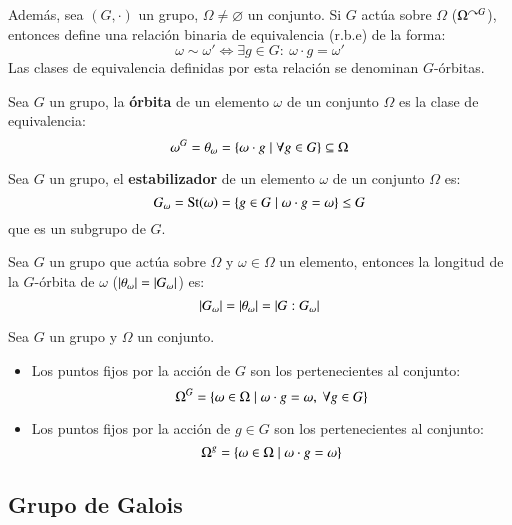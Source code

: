 Además, sea $(G, \cdot)$ un grupo, $\Omega \neq \varnothing$ un conjunto. Si $G$ actúa sobre $\Omega$ ($\Omega^{\curvearrowright G}$), entonces define una relación binaria de equivalencia (r.b.e) de la forma:
$$
    \omega \sim \omega' \iff \exists g \in G:\ \omega \cdot g = \omega'
$$
Las clases de equivalencia definidas por esta relación se denominan $G$-órbitas.

\begin{dfn}
    Sea $G$ un grupo, la \textbf{órbita} de un elemento $\omega$ de un conjunto $\Omega$ es la clase de equivalencia:
    $$
        \omega^G = \theta_\omega = \left\{\omega \cdot g \mid \forall g \in G\right\} \subseteq \Omega
    $$
\end{dfn}

\begin{dfn}
    Sea $G$ un grupo, el \textbf{estabilizador} de un elemento $\omega$ de un conjunto $\Omega$ es:
    $$
        G_\omega = \mathrm{St}(\omega) = \left\{g \in G \mid \omega \cdot g = \omega\right\} \leq G
    $$
    que es un subgrupo de $G$.
\end{dfn}

\begin{thm}\label{thm:orbita}
    Sea $G$ un grupo que actúa sobre $\Omega$ y $\omega \in \Omega$ un elemento, entonces la longitud de la $G$-órbita de $\omega$ ($\left|\theta_\omega\right| = \left|G_\omega\right|$) es:
    $$
        \left|G_\omega\right| = \left|\theta_\omega\right| = \left|G:G_\omega\right|
    $$
\end{thm}

\begin{dfn}
    Sea $G$ un grupo y $\Omega$ un conjunto.
    \begin{itemize}
        \item Los puntos fijos por la acción de $G$ son los pertenecientes al conjunto:
        $$
            \Omega^G = \left\{ \omega \in \Omega \mid \omega \cdot g = \omega,\ \forall g \in G\right\}
        $$
        \item Los puntos fijos por la acción de $g \in G$ son los pertenecientes al conjunto:
        $$
            \Omega^g = \left\{ \omega \in \Omega \mid \omega \cdot g = \omega\right\}
        $$
    \end{itemize}
\end{dfn}

\subsection{Grupo de Galois}

